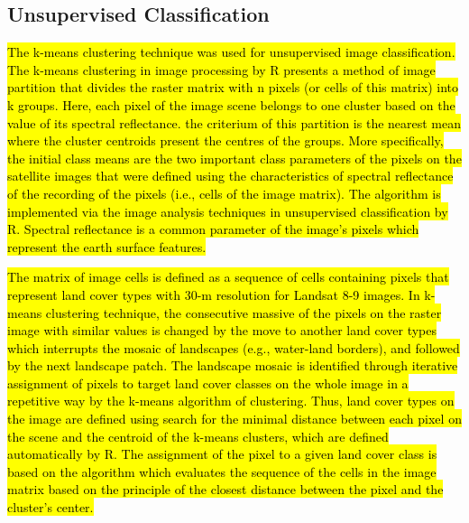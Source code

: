 \documentclass[12pt,a4paper,oneside]{article}
\def \newpar{\vspace{6pt}}
\begin{document}
\subsection*{Unsupervised Classification}

\newpar \hl{The k-means clustering technique was used for unsupervised image classification. The k-means clustering in image processing by R presents a method of image partition that divides the raster matrix with n pixels (or cells of this matrix) into k groups. Here, each pixel of the image scene belongs to one cluster based on the value of its spectral reflectance. the criterium of this partition is the nearest mean where the cluster centroids present the centres of the groups. More specifically, the initial class means are the two important class parameters of the pixels on the satellite images that were defined using the characteristics of spectral reflectance of the recording of the pixels (i.e., cells of the image matrix). The algorithm is implemented via the image analysis techniques in unsupervised classification by R. Spectral reflectance is a common parameter of the image's pixels which represent the earth surface features.}

\newpar \hl{The matrix of image cells is defined as a sequence of cells containing pixels that represent land cover types with 30-m resolution for Landsat 8-9 images. In k-means clustering technique, the consecutive massive of the pixels on the raster image with similar values is changed by the move to another land cover types which interrupts the mosaic of landscapes (e.g., water-land borders), and followed by the next landscape patch. The landscape mosaic is identified through iterative assignment of pixels to target land cover classes  on the whole image in a repetitive way by the k-means algorithm of clustering. Thus, land cover types on the image are defined using search for the minimal distance between each pixel on the scene and the centroid of the k-means clusters, which are defined automatically by R. The assignment of the pixel to a given land cover class is based on the algorithm which evaluates the sequence of the cells in the image matrix based on the principle of the closest distance between the pixel and the cluster's center.}
\end{document}
